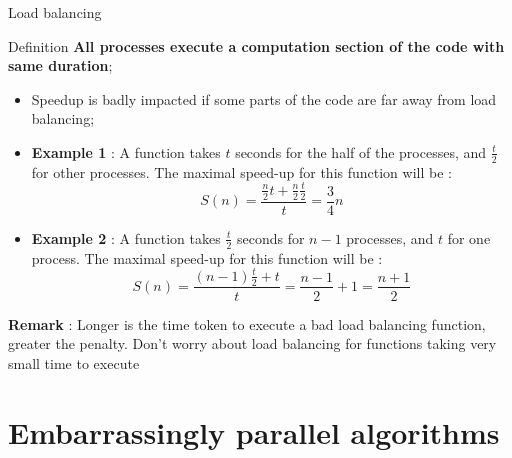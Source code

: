 \documentclass[compress,10pt,aspectratio=169]{beamer}
\begin{document}
\begin{frame}[fragile]{Load balancing}
    \scriptsize
    \begin{block}{Definition}
      \textbf{All processes execute a computation section of the code with same duration};
    \end{block}

    \begin{itemize}
        \item Speedup is badly impacted if some parts of the code are far away from load balancing;
        \item \textbf{Example 1} : A function takes $t$ seconds for the half of the processes, and $\frac{t}{2}$
              for other processes. The maximal speed-up for this function will be :
            \[
                S(n) = \frac{\frac{n}{2}t + \frac{n}{2}\frac{t}{2}}{t} = \frac{3}{4}n
            \]
        \item \textbf{Example 2} : A function takes $\frac{t}{2}$ seconds for $n-1$ processes, and $t$
            for one process. The maximal speed-up for this function will be :
          \[
              S(n) = \frac{(n-1)\frac{t}{2} + t}{t} = \frac{n-1}{2} + 1 = \frac{n+1}{2}
          \]
  \end{itemize}

  \textbf{Remark} : Longer is the time token to execute a bad load balancing function, greater the penalty. Don't worry
  about load balancing for functions taking very small time to execute
\end{frame}

\section{Embarrassingly parallel algorithms}
\end{document}
